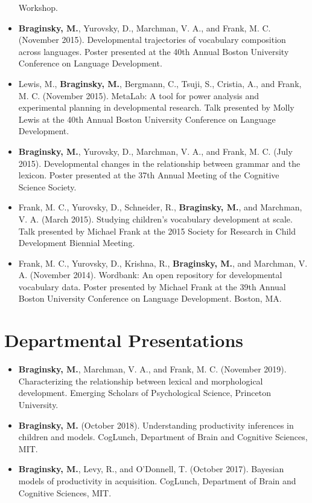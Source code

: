 \documentclass[11pt,]{article}
\begin{document}
\begin{itemize}
  Workshop.
\item
  \textbf{Braginsky, M.}, Yurovsky, D., Marchman, V. A., and Frank, M.
  C. (November 2015). Developmental trajectories of vocabulary
  composition across languages. Poster presented at the 40th Annual
  Boston University Conference on Language Development.
\item
  Lewis, M., \textbf{Braginsky, M.}, Bergmann, C., Tsuji, S., Cristia,
  A., and Frank, M. C. (November 2015). MetaLab: A tool for power
  analysis and experimental planning in developmental research. Talk
  presented by Molly Lewis at the 40th Annual Boston University
  Conference on Language Development.
\item
  \textbf{Braginsky, M.}, Yurovsky, D., Marchman, V. A., and Frank, M.
  C. (July 2015). Developmental changes in the relationship between
  grammar and the lexicon. Poster presented at the 37th Annual Meeting
  of the Cognitive Science Society.
\item
  Frank, M. C., Yurovsky, D., Schneider, R., \textbf{Braginsky, M.}, and
  Marchman, V. A. (March 2015). Studying children's vocabulary
  development at scale. Talk presented by Michael Frank at the 2015
  Society for Research in Child Development Biennial Meeting.
\item
  Frank, M. C., Yurovsky, D., Krishna, R., \textbf{Braginsky, M.}, and
  Marchman, V. A. (November 2014). Wordbank: An open repository for
  developmental vocabulary data. Poster presented by Michael Frank at
  the 39th Annual Boston University Conference on Language Development.
  Boston, MA.
\end{itemize}

\hypertarget{departmental-presentations}{%
\section{Departmental Presentations}\label{departmental-presentations}}

\begin{itemize}
\item
  \textbf{Braginsky, M.}, Marchman, V. A., and Frank, M. C. (November
  2019). Characterizing the relationship between lexical and
  morphological development. Emerging Scholars of Psychological Science,
  Princeton University.
\item
  \textbf{Braginsky, M.} (October 2018). Understanding productivity
  inferences in children and models. CogLunch, Department of Brain and
  Cognitive Sciences, MIT.
\item
  \textbf{Braginsky, M.}, Levy, R., and O'Donnell, T. (October 2017).
  Bayesian models of productivity in acquisition. CogLunch, Department
  of Brain and Cognitive Sciences, MIT.
\end{itemize}
\end{document}
